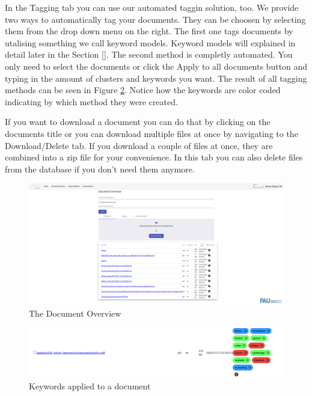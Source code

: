 \documentclass{article}
\begin{document}
In the Tagging tab you can use our automated taggin solution, too. We provide two ways to automatically tag your documents. They can be choosen by selecting them from the drop down menu on the right.
The first one tags documents by utalising something we call keyword models. Keyword models will explained in detail later in the Section \ref{}.
The second method is completly automated. You only need to select the documents or click the Apply to all documents button and typing in the amount of clusters and keywords you want.
The result of all tagging methods can be seen in Figure \ref{fig:applied_kw}. Notice how the keywords are color coded indicating by which method they were created.

If you want to download a document you can do that by clicking on the documents title or you can download multiple files at once by navigating to the Download/Delete tab.
If you download a couple of files at once, they are combined into a zip file for your convenience. In this tab you can also delete files from the database if you don't need them anymore.

\begin{figure}
    \centering
    \includegraphics[scale=0.25]{img/doc1.png}
    \caption{The Document Overview}
    \label{fig:doc_overview}
\end{figure}

\begin{figure}
    \centering
    \includegraphics[scale=0.25]{img/applied_kw.png}
    \caption{Keywords applied to a document}
    \label{fig:applied_kw}
\end{figure}
\end{document}
